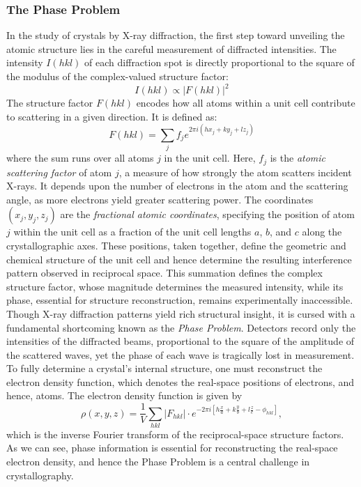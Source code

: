 \documentclass[aps,prb,twocolumn,superscriptaddress]{revtex4-2}
\begin{document}
\subsubsection{The Phase Problem}
In the study of crystals by X-ray diffraction, the first step toward unveiling
the atomic structure lies in the careful measurement of diffracted intensities.
The intensity $I(hkl)$ of each diffraction spot is directly proportional to the
square of the modulus of the complex-valued structure factor:
\begin{equation}
    I(hkl) \propto |F(hkl)|^2
\end{equation}
The structure factor $F(hkl)$ encodes how all atoms within a unit cell
contribute to scattering in a given direction. It is defined as:
\begin{equation}
    F(hkl) = \sum_j f_j e^{2\pi i(hx_j +ky_j + lz_j)}
\end{equation}
where the sum runs over all atoms $j$ in the unit cell. Here, $f_j$ is the
\textit{atomic scattering factor} of atom $j$, a measure of how strongly the
atom scatters incident X-rays. It depends upon the number of
electrons in the atom and the scattering angle, as more electrons yield greater
scattering power. The coordinates $(x_j, y_j, z_j)$ are the \textit{fractional
atomic coordinates}, specifying the position of atom $j$ within the unit cell
as a fraction of the unit cell lengths $a$, $b$, and $c$ along the
crystallographic axes. These positions, taken together, define the geometric
and chemical structure of the unit cell and hence determine the resulting
interference pattern observed in reciprocal space. This summation defines the
complex structure factor, whose magnitude determines the measured intensity,
while its phase, essential for structure reconstruction, remains
experimentally inaccessible. Though X-ray diffraction patterns yield rich
structural insight, it is cursed with a fundamental shortcoming known as the
\textit{Phase Problem}. Detectors record only the intensities of the diffracted
beams, proportional to the square of the amplitude of the scattered waves, yet
the phase of each wave is tragically lost in measurement. To fully determine a
crystal's internal structure, one must reconstruct the electron density
function, which denotes the real-space positions of electrons, and hence,
atoms. The electron density function is given by
\begin{equation}
    \rho(x, y, z) = \frac{1}{V} \sum_{hkl} |F_{hkl}| \cdot 
    e^{-2\pi i [h\frac{x}{a} + k\frac{y}{b} + l\frac{z}{c} - \phi_{hkl}]},
\end{equation}
which is the inverse Fourier transform of the reciprocal-space structure
factors. As we can see, phase information is essential for reconstructing the
real-space electron density, and hence the Phase Problem is a central challenge
in crystallography.
\end{document}

